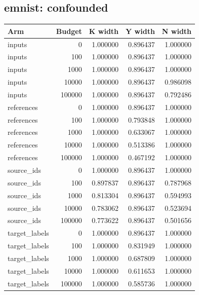 \reservetable
\subsection{emnist: confounded}

\begingroup\small
\setlength{\tabcolsep}{4pt}
\begin{longtable}{lrrrr}
\toprule

Arm & Budget & K width & Y width & N width\\\midrule\endhead

inputs & 0 & 1.000000 & 0.896437 & 1.000000\\

inputs & 100 & 1.000000 & 0.896437 & 1.000000\\

inputs & 1000 & 1.000000 & 0.896437 & 1.000000\\

inputs & 10000 & 1.000000 & 0.896437 & 0.986098\\

inputs & 100000 & 1.000000 & 0.896437 & 0.792486\\

references & 0 & 1.000000 & 0.896437 & 1.000000\\

references & 100 & 1.000000 & 0.793848 & 1.000000\\

references & 1000 & 1.000000 & 0.633067 & 1.000000\\

references & 10000 & 1.000000 & 0.513386 & 1.000000\\

references & 100000 & 1.000000 & 0.467192 & 1.000000\\

source\_ids & 0 & 1.000000 & 0.896437 & 1.000000\\

source\_ids & 100 & 0.897837 & 0.896437 & 0.787968\\

source\_ids & 1000 & 0.813304 & 0.896437 & 0.594993\\

source\_ids & 10000 & 0.783062 & 0.896437 & 0.523694\\

source\_ids & 100000 & 0.773622 & 0.896437 & 0.501656\\

target\_labels & 0 & 1.000000 & 0.896437 & 1.000000\\

target\_labels & 100 & 1.000000 & 0.831949 & 1.000000\\

target\_labels & 1000 & 1.000000 & 0.687809 & 1.000000\\

target\_labels & 10000 & 1.000000 & 0.611653 & 1.000000\\

target\_labels & 100000 & 1.000000 & 0.585736 & 1.000000\\

\bottomrule
\end{longtable}
\endgroup

